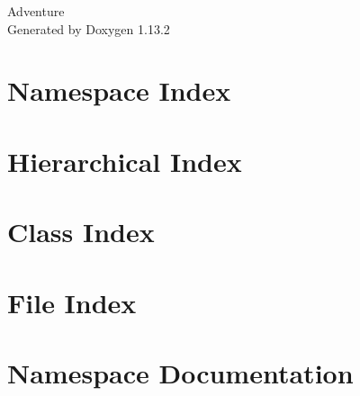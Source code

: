 \documentclass[twoside]{book}
\newcommand{\+}{\discretionary{\mbox{\scriptsize$\hookleftarrow$}}{}{}}
\newcommand{\clearemptydoublepage}{%
    \newpage{\pagestyle{empty}\cleardoublepage}%
  }
\begin{document}
  \raggedbottom
    \hypersetup{pageanchor=false,
                bookmarksnumbered=true,
                pdfencoding=unicode
               }
  \begin{titlepage}
  \vspace*{7cm}
  \begin{center}%
  {\Large Adventure}\\
  \vspace*{1cm}
  {\large Generated by Doxygen 1.13.2}\\
  \end{center}
  \end{titlepage}
  \clearemptydoublepage
  \tableofcontents
  \clearemptydoublepage
  \hypersetup{pageanchor=true}
\chapter{Namespace Index}

\chapter{Hierarchical Index}

\chapter{Class Index}

\chapter{File Index}

\chapter{Namespace Documentation}




\end{document}
